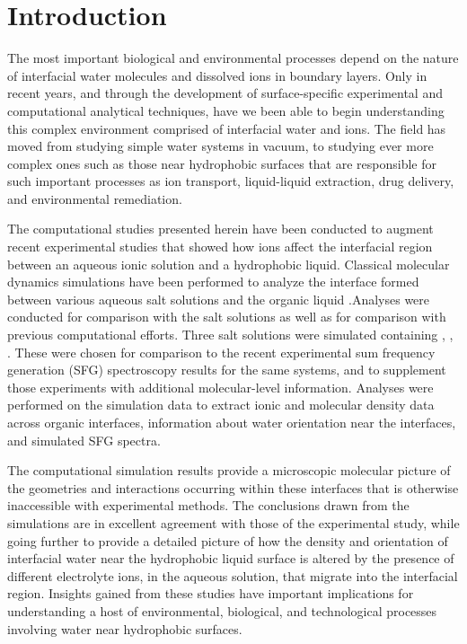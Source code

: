 \section{Introduction}

The most important biological and environmental processes depend on the nature of interfacial water molecules and dissolved ions in boundary layers. Only in recent years, and through the development of surface-specific experimental\cite{Charreteur2008,Chen2007,Luo2006,McArthur2006} and computational\cite{Schnell2004,Su2005,Wardle2005,Wick2008a} analytical techniques, have we been able to begin understanding this complex environment comprised of interfacial water and ions. The field has moved from studying simple water systems in vacuum, to studying ever more complex ones such as those near hydrophobic surfaces that are responsible for such important processes as ion transport, liquid-liquid extraction, drug delivery, and environmental remediation. 

The computational studies presented herein have been conducted to augment recent experimental studies that showed how ions affect the interfacial region between an aqueous ionic solution and a hydrophobic liquid.\cite{McFearin2009} Classical molecular dynamics simulations have been performed to analyze the interface formed between various aqueous salt solutions and the organic liquid \ctc.Analyses were conducted for comparison with the salt solutions as well as for comparison with previous computational efforts.\cite{Hore2007,Hore2008,Hore2007a,Walker2006b,Walker2007a,Walker2007b}  Three salt solutions were simulated containing \nacl, \sodnit, \sodsul. These were chosen for comparison to the recent experimental sum frequency generation (SFG) spectroscopy results for the same systems,\cite{McFearin2009} and to supplement those experiments with additional molecular-level information. Analyses were performed on the simulation data to extract ionic and molecular density data across organic interfaces, information about water orientation near the interfaces, and simulated SFG spectra. 



The computational simulation results provide a microscopic molecular picture of the geometries and interactions occurring within these interfaces that is otherwise inaccessible with experimental methods. The conclusions drawn from the simulations are in excellent agreement with those of the experimental study, while going further to provide a detailed picture of how the density and orientation of interfacial water near the hydrophobic liquid surface is altered by the presence of different electrolyte ions, in the aqueous solution, that migrate into the interfacial region. Insights gained from these studies have important implications for understanding a host of environmental, biological, and technological processes involving water near hydrophobic surfaces.

